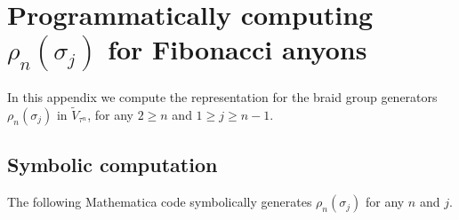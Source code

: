 \documentclass[a4paper,10pt,oneside]{book}
\theoremstyle{plain}
\theoremstyle{definition}
\theoremstyle{remark}
\begin{document}
\appendix


\chapter{Programmatically computing \texorpdfstring{$\rho_n(\sigma_j)$}{ρₙ(σⱼ)} for Fibonacci anyons}\label{sec:code}

In this appendix we compute the representation for the braid group generators $ρ_n(σ_j)$ in $\widetilde{V}_{τ^n}$, for any $2 \ge n$ and $1 \ge j \ge n-1$.

\section{Symbolic computation}

The following Mathematica code symbolically generates $ρ_n(σ_j)$ for any $n$ and $j$.
\end{document}
